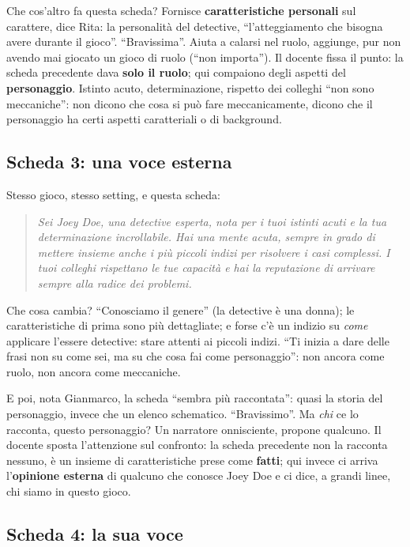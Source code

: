 Che cos'altro fa questa scheda? Fornisce \textbf{caratteristiche personali} sul
carattere, dice Rita: la personalità del detective, ``l'atteggiamento che bisogna
avere durante il gioco''. ``Bravissima''. Aiuta a calarsi nel ruolo, aggiunge,
pur non avendo mai giocato un gioco di ruolo (``non importa''). Il docente fissa il
punto: la scheda precedente dava \textbf{solo il ruolo}; qui compaiono degli aspetti
del \textbf{personaggio}. Istinto acuto, determinazione, rispetto dei colleghi
``non sono meccaniche'': non dicono che cosa si può fare meccanicamente, dicono che
il personaggio ha certi aspetti caratteriali o di background.

\subsection{Scheda 3: una voce esterna}

Stesso gioco, stesso setting, e questa scheda:
\begin{quote}
\emph{Sei Joey Doe, una detective esperta, nota per i tuoi istinti acuti e la tua
determinazione incrollabile. Hai una mente acuta, sempre in grado di mettere
insieme anche i più piccoli indizi per risolvere i casi complessi. I tuoi colleghi
rispettano le tue capacità e hai la reputazione di arrivare sempre alla radice dei
problemi.}
\end{quote}
Che cosa cambia? ``Conosciamo il genere'' (la detective è una donna); le
caratteristiche di prima sono più dettagliate; e forse c'è un indizio su
\emph{come} applicare l'essere detective: stare attenti ai piccoli indizi. ``Ti
inizia a dare delle frasi non su come sei, ma su che cosa fai come personaggio'':
non ancora come ruolo, non ancora come meccaniche.

E poi, nota Gianmarco, la scheda ``sembra più raccontata'': quasi la storia del
personaggio, invece che un elenco schematico. ``Bravissimo''. Ma \emph{chi} ce lo
racconta, questo personaggio? Un narratore onnisciente, propone qualcuno. Il
docente sposta l'attenzione sul confronto: la scheda precedente non la racconta
nessuno, è un insieme di caratteristiche prese come \textbf{fatti}; qui invece ci
arriva l'\textbf{opinione esterna} di qualcuno che conosce Joey Doe e ci dice, a
grandi linee, chi siamo in questo gioco.

\subsection{Scheda 4: la sua voce}

